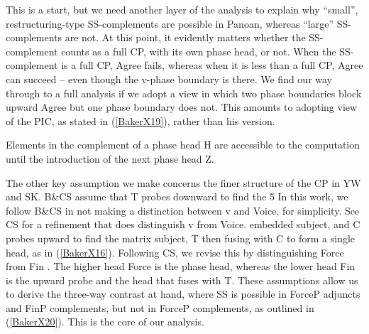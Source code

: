 \documentclass[output=paper]{langscibook}
\begin{document}
This is a start, but we need another layer of the analysis to explain why “small”, restructuring-type SS-complements are possible in Panoan, whereas “large” SS-complements are not. At this point, it evidently matters whether the SS-com\-ple\-ment counts as a full CP, with its own phase head, or not. When the SS-complement is a full CP, Agree fails, whereas when it is less than a full CP, Agree can succeed – even though the v-phase boundary is there. We find our way through to a full analysis if we adopt a view in which two phase boundaries block upward Agree but one phase boundary does not. This amounts to adopting \citet[13--14]{chomsky2001derivation} view of the PIC, as stated in (\ref{BakerX19}), rather than his \citeyearpar{chomsky2000minimalist} version.

\begin{exe}
    \ex Elements in the complement of a phase head H are accessible to the computation until the introduction of the next phase head Z. \label{BakerX19}
\end{exe}

The other key assumption we make concerns the finer structure of the CP in YW and SK. B\&CS assume that T probes downward to find the
5 In this work, we follow B\&CS in not making a distinction between v and Voice, for simplicity. See CS for a refinement that does distinguish v from Voice.
embedded subject, and C probes upward to find the matrix subject, T then fusing with C to form a single head, as in (\ref{BakerX16}). Following CS, we revise this by distinguishing Force from Fin \citep{rizzi1997fine}. The higher head Force is the phase head, whereas the lower head Fin is the upward probe and the head that fuses with T. These assumptions allow us to derive the three-way contrast at hand, where SS is possible in ForceP adjuncts and FinP complements, but not in ForceP complements, as outlined in (\ref{BakerX20}). This is the core of our analysis.
\end{document}
